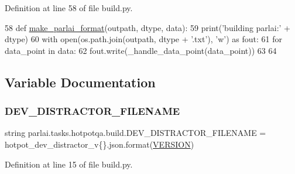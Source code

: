 Definition at line 58 of file build.\+py.


\begin{DoxyCode}
58 \textcolor{keyword}{def }\hyperlink{namespaceparlai_1_1tasks_1_1quac_1_1build_a08c212462b5c58cde91192d35f24f0cc}{make\_parlai\_format}(outpath, dtype, data):
59     print(\textcolor{stringliteral}{'building parlai:'} + dtype)
60     with open(os.path.join(outpath, dtype + \textcolor{stringliteral}{'.txt'}), \textcolor{stringliteral}{'w'}) \textcolor{keyword}{as} fout:
61         \textcolor{keywordflow}{for} data\_point \textcolor{keywordflow}{in} data:
62             fout.write(\_handle\_data\_point(data\_point))
63 
64 
\end{DoxyCode}


\subsection{Variable Documentation}
\mbox{\label{namespaceparlai_1_1tasks_1_1hotpotqa_1_1build_a86adac1f9e9da2911e21beaafefc2cee}} 
\subsubsection{\texorpdfstring{D\+E\+V\+\_\+\+D\+I\+S\+T\+R\+A\+C\+T\+O\+R\+\_\+\+F\+I\+L\+E\+N\+A\+ME}{DEV\_DISTRACTOR\_FILENAME}}
{\footnotesize\ttfamily string parlai.\+tasks.\+hotpotqa.\+build.\+D\+E\+V\+\_\+\+D\+I\+S\+T\+R\+A\+C\+T\+O\+R\+\_\+\+F\+I\+L\+E\+N\+A\+ME = \textquotesingle{}hotpot\+\_\+dev\+\_\+distractor\+\_\+v\{\}.json\textquotesingle{}.format(\hyperlink{namespaceparlai_1_1tasks_1_1hotpotqa_1_1build_a57a5627d2111821eb32c42f113773b1a}{V\+E\+R\+S\+I\+ON})}



Definition at line 15 of file build.\+py.

\mbox{\label{namespaceparlai_1_1tasks_1_1hotpotqa_1_1build_aabcca98f76be2304d8393dcf7ddc6648}} 
